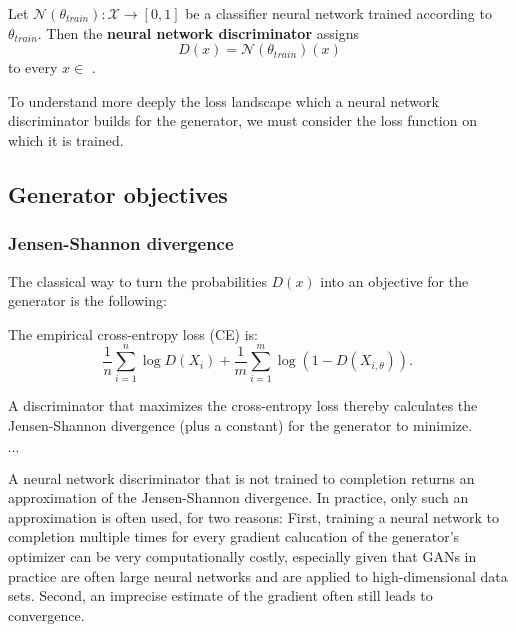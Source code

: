 \begin{definition}
    Let $\mathcal{N}(\theta_{train}): \mathcal{X} \rightarrow [0, 1]$ be a classifier neural network trained according to $\theta_{train}$.
    Then the \textbf{neural network discriminator} assigns
    \begin{equation}
        D(x) = \mathcal{N}(\theta_{train})(x)
    \end{equation}
    to every $x \in$ . %
\end{definition}

To understand more deeply the loss landscape which a neural network discriminator builds for the generator, we must consider the loss function on which it is trained.

\subsection{Generator objectives}
\label{sec:losses}

\subsubsection{Jensen-Shannon divergence}
\label{sec:ce_loss}

The classical way to turn the probabilities $D(x)$ into an objective for the generator is the following: 

\begin{definition}[Cross-entropy loss] %
    The empirical cross-entropy loss (CE) is:
    $$
    \frac{1}{n} \sum_{i=1}^n \log D\left(X_i\right)+\frac{1}{m} \sum_{i=1}^m \log \left(1-D\left(X_{i, \theta}\right)\right) \text {. }
    $$    
\end{definition}

A discriminator that maximizes the cross-entropy loss thereby calculates the Jensen-Shannon divergence (plus a constant) for the generator to minimize.
\begin{theorem}
    $\cdots$
\end{theorem}
A neural network discriminator that is not trained to completion returns an approximation of the Jensen-Shannon divergence.
In practice, only such an approximation is often used, for two reasons:
First, training a neural network to completion multiple times for every gradient calucation of the generator's optimizer can be very computationally costly, %
especially given that GANs in practice are often large neural networks and are applied to high-dimensional data sets.
Second, an imprecise estimate of the gradient often still leads to convergence. %

